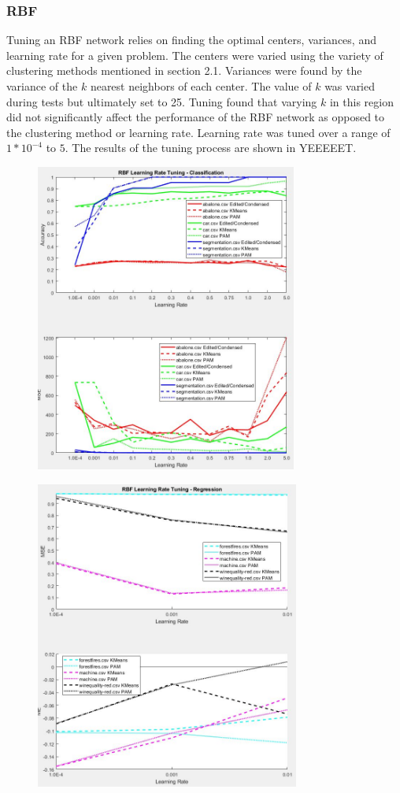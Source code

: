 \documentclass[twoside,11pt]{article}
\begin{document}
\subsubsection{RBF}
Tuning an RBF network relies on finding the optimal centers, variances, and learning rate for a given problem. The centers were varied using the variety of clustering methods mentioned in section 2.1. Variances were found by the variance of the $k$ nearest neighbors of each center. The value of $k$ was varied during tests but ultimately set to 25. Tuning found that varying $k$ in this region did not significantly affect the performance of the RBF network as opposed to the clustering method or learning rate. Learning rate was tuned over a range of $1*10^{-4}$ to $5$. The results of the tuning process are shown in YEEEEET. %

\begin{figure}[h]
	\centering
	\includegraphics[height=4in]{FINAL_FIGS/RBF_LR_TUNING_CLASS.JPG}
\end{figure}
\begin{figure}[h]
	\centering
	\includegraphics[height=4in]{FINAL_FIGS/RBF_LR_TUNING_REG.JPG}
\end{figure}
\end{document}
